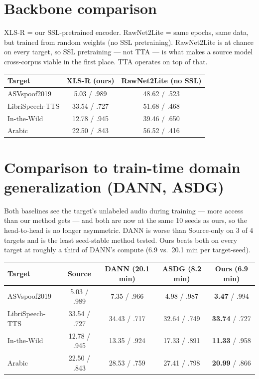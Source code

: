 \documentclass[11pt]{article}
\begin{document}
\section*{Backbone comparison}
XLS-R = our SSL-pretrained encoder. RawNet2Lite = same epochs, same data, but
trained from random weights (no SSL pretraining). RawNet2Lite is at chance on
every target, so SSL pretraining --- not TTA --- is what makes a source model
cross-corpus viable in the first place. TTA operates on top of that.
\begin{table}[h]
\centering
\begin{tabular}{@{}lcc@{}}
\toprule
Target & XLS-R (ours) & RawNet2Lite (no SSL) \\
\midrule
ASVspoof2019 & 5.03 / .989 & 48.62 / .523 \\
LibriSpeech-TTS & 33.54 / .727 & 51.68 / .468 \\
In-the-Wild & 12.78 / .945 & 39.46 / .650 \\
Arabic & 22.50 / .843 & 56.52 / .416 \\
\bottomrule
\end{tabular}
\end{table}

\newpage
\section*{Comparison to train-time domain generalization (DANN, ASDG)}
Both baselines see the target's unlabeled audio during training --- more access
than our method gets --- and both are now at the same 10 seeds as ours, so the
head-to-head is no longer asymmetric. DANN is worse than Source-only on 3 of 4
targets and is the least seed-stable method tested. Ours beats both on every
target at roughly a third of DANN's compute (6.9 vs.\ 20.1 min per
target-seed).
\begin{table}[h]
\centering
\begin{tabular}{@{}lcccc@{}}
\toprule
Target & Source & DANN (20.1 min) & ASDG (8.2 min) & Ours (6.9 min) \\
\midrule
ASVspoof2019 & 5.03 / .989 & 7.35 / .966 & 4.98 / .987 & \textbf{3.47} / .994 \\
LibriSpeech-TTS & 33.54 / .727 & 34.43 / .717 & 32.64 / .749 & \textbf{33.74} / .727 \\
In-the-Wild & 12.78 / .945 & 13.35 / .924 & 17.33 / .891 & \textbf{11.33} / .958 \\
Arabic & 22.50 / .843 & 28.53 / .759 & 27.41 / .798 & \textbf{20.99} / .866 \\
\bottomrule
\end{tabular}
\end{table}
\end{document}
